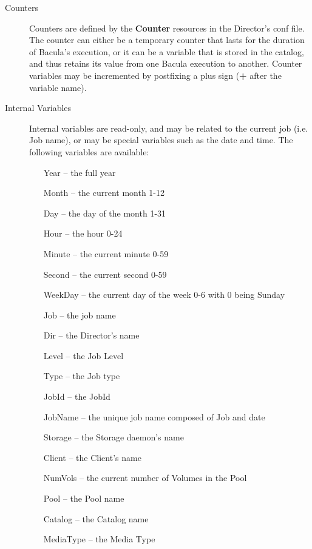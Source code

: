 \begin{description}

\item [Counters]
   Counters are defined by the {\bf Counter}  resources in the Director's conf
file. The counter can either  be a temporary counter that lasts for the
duration of Bacula's  execution, or it can be a variable that is stored in 
the catalog, and thus retains its value from one Bacula execution  to another.
Counter variables may be incremented by postfixing  a plus sign ({\bf +} after
the variable name). 

\item [Internal Variables]
   Internal variables are read-only,  and may be related to the current job (i.e.
Job name), or  may be special variables such as the date and time.  The
following variables are available:  

\begin{itemize}
\item [Year]  -- the full year  
\item [Month]  -- the current month 1-12  
\item [Day]  -- the day of the month 1-31  
\item [Hour]  -- the hour 0-24  
\item [Minute]  -- the current minute 0-59  
\item [Second]  -- the current second 0-59  
\item [WeekDay]  -- the current day of the week 0-6 with 0 being Sunday  
\item [Job]  -- the job name  
\item [Dir]  -- the Director's name  
\item [Level]  -- the Job Level 
\item [Type]  -- the Job type 
\item [JobId]  -- the JobId 
\item [JobName]  -- the unique job name composed of Job and date  
\item [Storage]  -- the Storage daemon's name  
\item [Client]  -- the Client's name  
\item [NumVols]  -- the current number of Volumes in the Pool  
\item [Pool]  -- the Pool name  
\item [Catalog]  -- the Catalog name  
\item [MediaType] -- the Media Type  
   \end{itemize}


\end{description}
